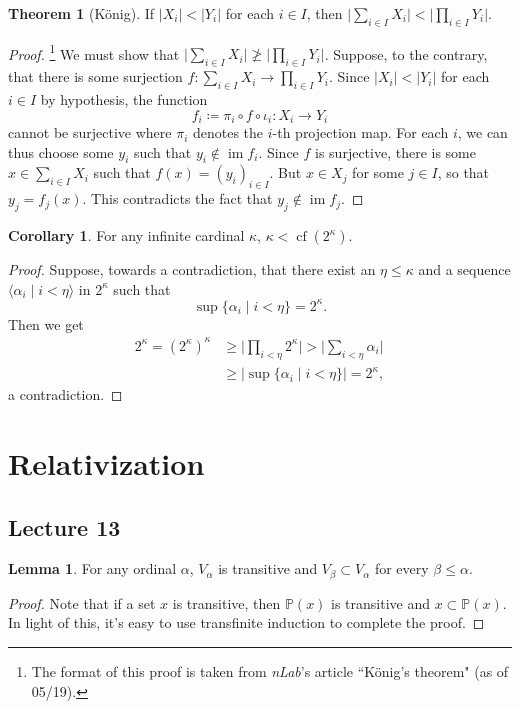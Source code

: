 \documentclass[10pt,letterpaper,cm]{nupset}
\theoremstyle{definition}
\theoremstyle{theorem}
\newtheorem{theorem}[definition]{Theorem}
\newtheorem{lemma}[definition]{Lemma}
\newtheorem{corollary}[definition]{Corollary}
\theoremstyle{remark}
\renewcommand{\P}{\mathbb P}
\newcommand{\1}{\mathbf{1}}
\newcommand{\0}{\vec 0}
\DeclareMathOperator{\im}{im}
\DeclareMathOperator{\cf}{cf}
\begin{document}
\begin{theorem}[K\"onig]
If $\lvert{X_i}\rvert < \lvert{Y_i}\rvert$ for each $i \in I$, then $\lvert{\sum_{i\in I} X_i}\rvert < \lvert{\prod_{i\in I} Y_i}\rvert$.
\end{theorem}
\begin{proof}\footnote{The format of this proof is taken from \textit{nLab}'s article ``K\"onig's theorem" (as of 05/19).}
We must show that $\lvert{\sum_{i\in I} X_i}\rvert \not \geq \lvert{\prod_{i\in I} Y_i}\rvert$. Suppose, to the contrary, that there is some surjection $f: \sum_{i\in I} X_i \to \prod_{i\in I} Y_i$. Since $\lvert{X_i}\rvert < \lvert{Y_i}\rvert$ for each $i\in I$ by hypothesis, the function $$f_i \coloneqq \pi_i \circ f \circ \iota_i: X_i \to Y_i$$ cannot be surjective where $\pi_i$ denotes the $i$-th projection map. For each $i$, we can thus choose some $y_i$ such that $y_i \notin \im{f_i}$. Since $f$ is surjective, there is some $x\in \sum_{i\in I} X_i $ such that $f(x) = (y_i)_{i\in I}$. But $x\in X_j$ for some $j\in I$, so that $y_j = f_j(x)$. This contradicts the fact that $y_j \notin \im{f_j}$. 
\end{proof}

\begin{corollary}
For any infinite cardinal $\kappa$, $\kappa< \cf(2^{\kappa})$.
\end{corollary}
\begin{proof}
Suppose, towards a contradiction, that there exist an $\eta \leq \kappa$ and a  sequence $\langle \alpha_i \mid i < \eta \rangle$ in $2^{\kappa}$ such that $$ \sup\{\alpha_i \mid i <\eta\} = 2^{\kappa}.$$ Then we get 
\begin{align*}    
2^{\kappa}  = (2^{\kappa})^{\kappa} 
&  \geq  \lvert{ \prod_{i < \eta} 2^{\kappa}}\rvert 
> \lvert{\sum_{i < \eta} \alpha_i}\rvert
\\ & \geq \lvert{\sup\{\alpha_i \mid i <\eta\}}\rvert 
= 2^{\kappa}
,
\end{align*}  a contradiction. 
\end{proof}

\section{Relativization}

\subsection{Lecture 13}


\begin{lemma}\label{cum}
For any ordinal $\alpha$, $V_{\alpha}$ is transitive and $V_{\beta} \subset V_{\alpha}$ for every $\beta \leq \alpha$. 
\end{lemma}
\begin{proof}
Note that if a set $x$ is transitive, then  $\P(x)$ is transitive and $x\subset \P(x)$. In light of this, it's easy to use transfinite induction to complete the proof.
\end{proof}
\end{document}
